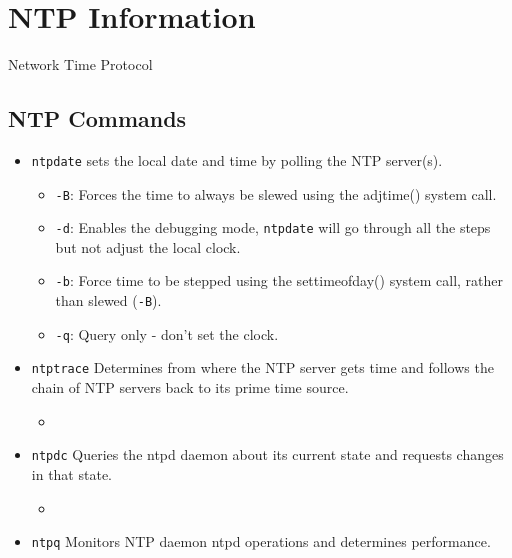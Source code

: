 \section{NTP Information}
Network Time Protocol
\subsection{NTP Commands}
\begin{itemize}
    \item \verb|ntpdate| sets the local date and time by polling the NTP server(s).
    \begin{itemize}
        \item \verb|-B|: Forces the time to always be slewed using the adjtime() system call.
        \item \verb|-d|: Enables the debugging mode, \verb|ntpdate| will go through all the steps but not adjust the local clock.
        \item \verb|-b|: Force time to be stepped using the settimeofday() system call, rather than slewed (\verb|-B|).
        \item \verb|-q|: Query only - don't set the clock.
    \end{itemize}
    \item \verb|ntptrace| Determines from where the NTP server gets time and follows the chain of NTP servers back to its prime time source.
    \begin{itemize}
        \item 
    \end{itemize}
    \item \verb|ntpdc| Queries the ntpd daemon about its current state and requests changes in that state.
    \begin{itemize}
        \item
    \end{itemize}
    \item \verb|ntpq| Monitors NTP daemon ntpd operations and determines performance.
\end{itemize}